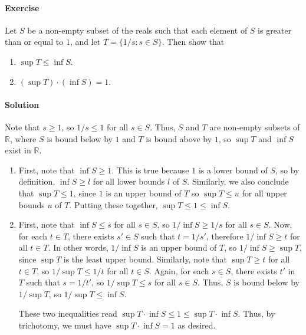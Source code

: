\documentclass[10pt]{article}
\newcounter{prob}
\def\problem{\stepcounter{prob}\paragraph{Exercise \arabic{prob}}}
\def\solution{\paragraph{Solution}}
\begin{document}
        \problem Let $S$ be a non-empty subset of the reals such that each element of $S$ is greater than or equal to $1$, and let
        $T = \{1 / s : s \in S\}$. Then show that
        \begin{enumerate}
                \item $\sup{T} \leq \inf{S}$.
                \item $(\sup{T}) \cdot (\inf{S}) = 1$.
        \end{enumerate}
        \solution Note that $s \geq 1$, so $1 /s \leq 1$ for all $s \in S$. Thus, $S$ and $T$ are non-empty subsets of $\mathbb{R}$, where
        $S$ is bound below by $1$ and $T$ is bound above by $1$, so $\sup{T}$ and $\inf{S}$ exist in $\mathbb{R}$.
        \begin{enumerate}
                \item First, note that $\inf{S} \geq 1$. This is true because $1$ is a lower bound of $S$, so by definition, $\inf{S} \geq l$
                for all lower bounds $l$ of $S$. Similarly, we also conclude that $\sup{T} \leq 1$, since $1$ is an upper bound of $T$
                so $\sup{T} \leq u$ for all upper bounds $u$ of $T$. Putting these together, $\sup{T} \leq 1 \leq \inf{S}$.

                \item First, note that $\inf{S} \leq s$ for all $s \in S$, so $1 /\inf{S} \geq 1 /s$ for all $s \in S$. Now, for each $t \in T$,
                there exists $s' \in S$ such that $t = 1 /s'$, therefore $1 /\inf{S} \geq t$ for all $t \in T$. In other words, $1 /\inf{S}$ is an
                upper bound of $T$, so $1 /\inf{S} \geq \sup{T}$, since $\sup{T}$ is the least upper bound.
                Similarly, note that $\sup{T} \geq t$ for all $t \in T$, so $1 /\sup{T} \leq 1 /t$ for all $t \in S$. Again, for each $s \in S$,
                there exists $t'$ in $T$ such that $s = 1 /t'$, so $1 /\sup{T} \leq s$ for all $s \in S$. Thus, $S$ is bound below by $1 /\sup{T}$,
                so $1 /\sup{T} \leq \inf{S}$.

                These two inequalities read $\sup{T}\cdot\inf{S} \leq 1 \leq \sup{T}\cdot\inf{S}$. Thus, by trichotomy, we must have
                $\sup{T}\cdot\inf{S} = 1$ as desired.
        \end{enumerate}
\end{document}
